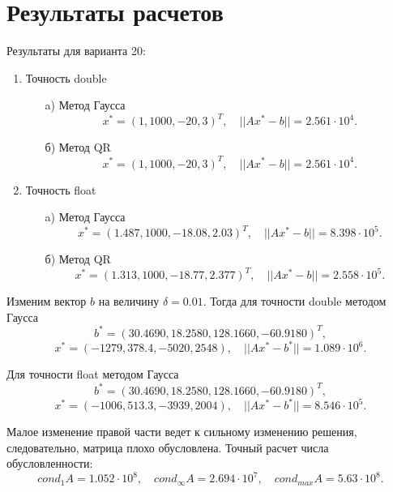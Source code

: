 \documentclass[12pt, a4paper]{article}
\begin{document}
\section{Результаты расчетов}
Результаты для варианта 20:
\begin{enumerate}
\item Точность double
	\begin{enumerate}
	\item[a)] Метод Гаусса
	$$x^* = (1 , 1000, -20 ,3)^{T},\quad ||Ax^{*}-b|| = 2{.}561\cdot10^4.$$
	\item[б)] Метод QR
	$$x^* = (1 , 1000, -20 ,3)^{T},\quad ||Ax^{*}-b|| = 2{.}561\cdot10^4.$$
	\end{enumerate}
\item Точность float
	\begin{enumerate}
	\item[a)] Метод Гаусса
	$$x^* = (1{.}487 , 1000, -18{.}08 ,2{.}03)^{T},\quad ||Ax^{*}-b|| = 8{.}398\cdot10^5.$$
	\item[б)] Метод QR
	$$x^* = (1{.}313 , 1000, -18{.}77 ,2{.}377)^{T},\quad ||Ax^{*}-b|| = 2{.}558\cdot10^5.$$
	\end{enumerate}
\end{enumerate}
Изменим вектор $b$ на величину $\delta = 0.01$. Тогда для точности double методом Гаусса
$$b^* = (30.4690, 18{.}2580, 128{.}1660, -60{.}9180)^T,$$
$$x^* = (-1279, 378{.}4, -5020, 2548), \quad ||Ax^{*}-b^*|| =  1{.}089\cdot10^6.$$

Для точности float методом Гаусса
$$b^* = (30.4690, 18{.}2580, 128{.}1660, -60{.}9180)^T,$$
$$x^* = (-1006, 513{.}3, -3939, 2004), \quad ||Ax^{*}-b^*|| =  8{.}546\cdot10^5.$$

Малое изменение правой части ведет к сильному изменению решения, следовательно, матрица плохо обусловлена. Точный расчет числа обусловленности: 
$$cond_1A = 1{.}052\cdot10^8,\quad cond_{\infty}A = 2{.}694\cdot10^7, \quad cond_{max}A = 5{.}63\cdot10^8 .$$
\end{document}
